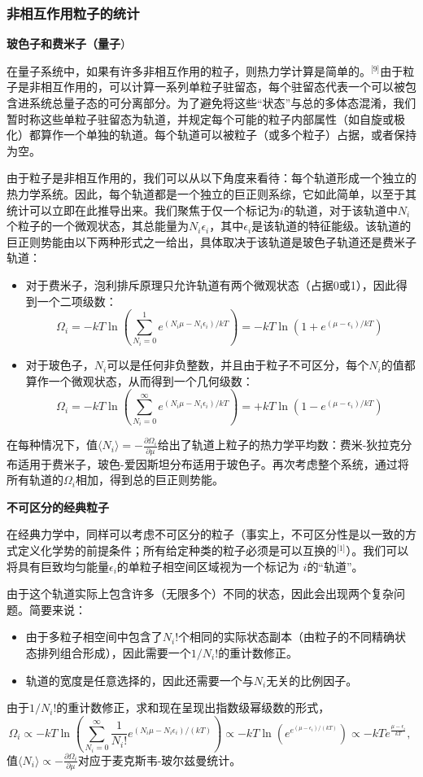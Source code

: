 \subsubsection{非相互作用粒子的统计}

\textbf{玻色子和费米子（量子}）

在量子系统中，如果有许多非相互作用的粒子，则热力学计算是简单的。\(^\text{[9]}\)由于粒子是非相互作用的，可以计算一系列单粒子驻留态，每个驻留态代表一个可以被包含进系统总量子态的可分离部分。为了避免将这些“状态”与总的多体态混淆，我们暂时称这些单粒子驻留态为轨道，并规定每个可能的粒子内部属性（如自旋或极化）都算作一个单独的轨道。每个轨道可以被粒子（或多个粒子）占据，或者保持为空。

由于粒子是非相互作用的，我们可以从以下角度来看待：每个轨道形成一个独立的热力学系统。因此，每个轨道都是一个独立的巨正则系综，它如此简单，以至于其统计可以立即在此推导出来。我们聚焦于仅一个标记为\(i\)的轨道，对于该轨道中\(N_i\)个粒子的一个微观状态，其总能量为\(N_i\epsilon_i\)，其中\(\epsilon_i\)是该轨道的特征能级。该轨道的巨正则势能由以下两种形式之一给出，具体取决于该轨道是玻色子轨道还是费米子轨道：

\begin{itemize}
\item 对于费米子，泡利排斥原理只允许轨道有两个微观状态（占据0或1），因此得到一个二项级数：
\[
\Omega_i = -kT \ln \left( \sum_{N_i=0}^{1} e^{(N_i \mu - N_i \epsilon_i)/kT} \right) = -kT \ln \left( 1 + e^{(\mu - \epsilon_i)/kT} \right)~
\]
\item 对于玻色子，\(N_i\)可以是任何非负整数，并且由于粒子不可区分，每个\(N_i\)的值都算作一个微观状态，从而得到一个几何级数：
\[
\Omega_i = -kT \ln \left( \sum_{N_i=0}^{\infty} e^{(N_i \mu - N_i \epsilon_i)/kT} \right) = +kT \ln \left( 1 - e^{(\mu - \epsilon_i)/kT} \right)~
\]
\end{itemize}
在每种情况下，值\(\langle N_i \rangle = -\frac{\partial \Omega_i}{\partial \mu}\)给出了轨道上粒子的热力学平均数：费米-狄拉克分布适用于费米子，玻色-爱因斯坦分布适用于玻色子。再次考虑整个系统，通过将所有轨道的\(\Omega_i\)相加，得到总的巨正则势能。

\textbf{不可区分的经典粒子}

在经典力学中，同样可以考虑不可区分的粒子（事实上，不可区分性是以一致的方式定义化学势的前提条件；所有给定种类的粒子必须是可以互换的\(^\text{[1]}\)）。我们可以将具有巨致均匀能量\(\epsilon_i\)的单粒子相空间区域视为一个标记为 \(i\)的“轨道”。

由于这个轨道实际上包含许多（无限多个）不同的状态，因此会出现两个复杂问题。简要来说：
\begin{itemize}
\item 由于多粒子相空间中包含了\(N_i!\)个相同的实际状态副本（由粒子的不同精确状态排列组合形成），因此需要一个\(1/N_i!\)的重计数修正。
\item 轨道的宽度是任意选择的，因此还需要一个与\(N_i\)无关的比例因子。
\end{itemize}
由于\(1/N_i!\)的重计数修正，求和现在呈现出指数级幂级数的形式，
\[
\Omega_i \propto -kT \ln \left( \sum_{N_i=0}^{\infty} \frac{1}{N_i!} e^{(N_i \mu - N_i \epsilon_i)/(kT)} \right)
\propto -kT \ln \left( e^{e^{(\mu - \epsilon_i)/(kT)}} \right)
\propto -kT e^{\frac{\mu - \epsilon_i}{kT}},~
\]
值\(\langle N_i \rangle \propto -\frac{\partial \Omega_i}{\partial \mu}\)对应于麦克斯韦-玻尔兹曼统计。
